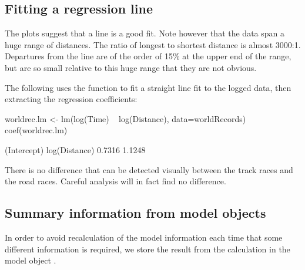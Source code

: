 \subsection*{Fitting a regression line}

The plots suggest that a line is a good fit.  Note however that the data span a
huge range of distances.  The ratio of longest to shortest distance is
almost 3000:1. Departures from the line are of the order of 15\% at
the upper end of the range, but are so small relative to
this huge range that they are not obvious.

The following   uses the function
 to fit a straight line fit to the logged data,
then extracting the regression coefficients:
\begin{Schunk}
\begin{Sinput}
worldrec.lm <- lm(log(Time) ~ log(Distance),
                  data=worldRecords)
coef(worldrec.lm)
\end{Sinput}
\begin{Soutput}
  (Intercept) log(Distance) 
       0.7316        1.1248 
\end{Soutput}
\end{Schunk}
There is no difference that can be detected visually between the track
races and the road races.  Careful analysis will in fact find no
difference.

\subsection{Summary information from model objects}\label{ss:sum-modobj}
In order to avoid recalculation of the model information
each time that some different information is required, we store the
result from the  calculation in the model object
.

